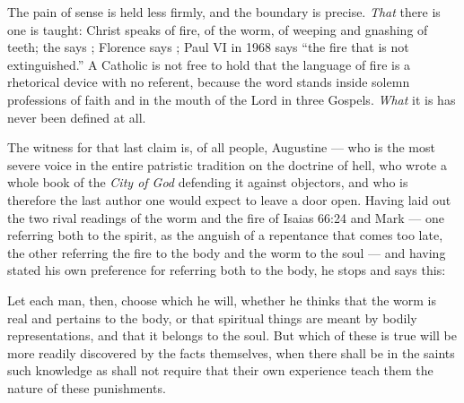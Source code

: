 The pain of sense is held less firmly, and the boundary is precise. \emph{That} there is one is taught: Christ speaks of fire, of the worm, of weeping and gnashing of teeth; the  says ; Florence says ; Paul VI in 1968 says ``the fire that is not extinguished.'' A Catholic is not free to hold that the language of fire is a rhetorical device with no referent, because the word stands inside solemn professions of faith and in the mouth of the Lord in three Gospels. \emph{What} it is has never been defined at all.

The witness for that last claim is, of all people, Augustine --- who is the most severe voice in the entire patristic tradition on the doctrine of hell, who wrote a whole book of the \emph{City of God} defending it against objectors, and who is therefore the last author one would expect to leave a door open. Having laid out the two rival readings of the worm and the fire of Isaias 66:24 and Mark --- one referring both to the spirit, as the anguish of a repentance that comes too late, the other referring the fire to the body and the worm to the soul --- and having stated his own preference for referring both to the body, he stops and says this:

\begin{studyframe}
Let each man, then, choose which he will, whether he thinks that the worm is real and pertains to the body, or that spiritual things are meant by bodily representations, and that it belongs to the soul. But which of these is true will be more readily discovered by the facts themselves, when there shall be in the saints such knowledge as shall not require that their own experience teach them the nature of these punishments.
\end{studyframe}

